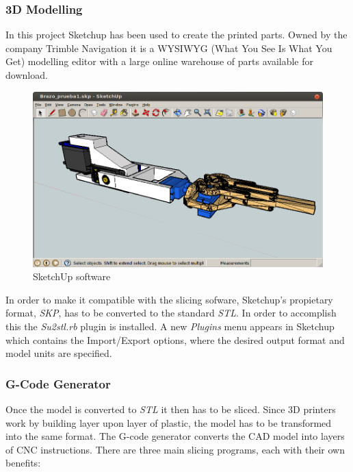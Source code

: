 		\subsubsection{3D Modelling }
		In this project Sketchup has been used to create the printed parts. Owned by the company Trimble Navigation it is a WYSIWYG (What You See Is What You Get) modelling editor with a large online warehouse of parts available for download. \\

			\begin{figure}[H]
				\centering
				\includegraphics[scale=0.4]{images/ProjectComponents/sketchup-arm.png}
				\caption{SketchUp software}
				\label{}
			\end{figure}
			\bigskip

		In order to make it compatible with the slicing sofware, Sketchup's propietary format, \textit{SKP}, has to be converted to the standard \textit{STL}. In order to accomplish this the \textit{Su2stl.rb} plugin is installed. A new \textit{Plugins} menu appears in Sketchup which contains the Import/Export options, where the desired output format and model units are specified.



		\subsubsection{G-Code Generator} 
		Once the model is converted to \textit{STL} it then has to be sliced. Since 3D printers work by building layer upon layer of plastic, the model has to be transformed into the same format. The G-code generator converts the CAD model into layers of CNC instructions. There are three main slicing programs, each with their own benefits:

